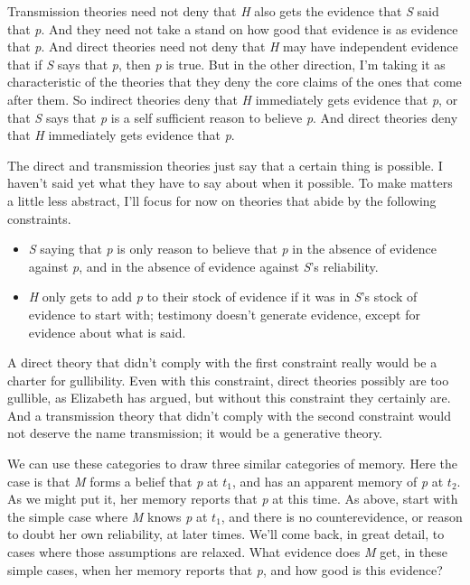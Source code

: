 Transmission theories need not deny that \emph{H} also gets the evidence that \emph{S} said that \emph{p}. And they need not take a stand on how good that evidence is as evidence that \emph{p}. And direct theories need not deny that \emph{H} may have independent evidence that if \emph{S} says that \emph{p}, then \emph{p} is true. But in the other direction, I'm taking it as characteristic of the theories that they deny the core claims of the ones that come after them. So indirect theories deny that \emph{H} immediately gets evidence that \emph{p}, or that \emph{S} says that \emph{p} is a self sufficient reason to believe \emph{p}. And direct theories deny that \emph{H} immediately gets evidence that \emph{p}.

The direct and transmission theories just say that a certain thing is possible. I haven't said yet what they have to say about when it possible. To make matters a little less abstract, I'll focus for now on theories that abide by the following constraints.

\begin{itemize}
\item \emph{S} saying that \emph{p} is only reason to believe that \emph{p} in the absence of evidence against \emph{p}, and in the absence of evidence against \emph{S}'s reliability.

\item \emph{H} only gets to add \emph{p} to their stock of evidence if it was in \emph{S}'s stock of evidence to start with; testimony doesn't generate evidence, except for evidence about what is said.

\end{itemize}
A direct theory that didn't comply with the first constraint really would be a charter for gullibility. Even with this constraint, direct theories possibly are too gullible, as Elizabeth  \citet{Fricker1994} has argued, but without this constraint they certainly are. And a transmission theory that didn't comply with the second constraint would not deserve the name transmission; it would be a generative theory.

We can use these categories to draw three similar categories of memory. Here the case is that \emph{M} forms a belief that \emph{p} at $t_1$, and has an apparent memory of \emph{p} at $t_2$. As we might put it, her memory reports that \emph{p} at this time. As above, start with the simple case where \emph{M} knows \emph{p} at $t_1$, and there is no counterevidence, or reason to doubt her own reliability, at later times. We'll come back, in great detail, to cases where those assumptions are relaxed. What evidence does \emph{M} get, in these simple cases, when her memory reports that \emph{p}, and how good is this evidence?

